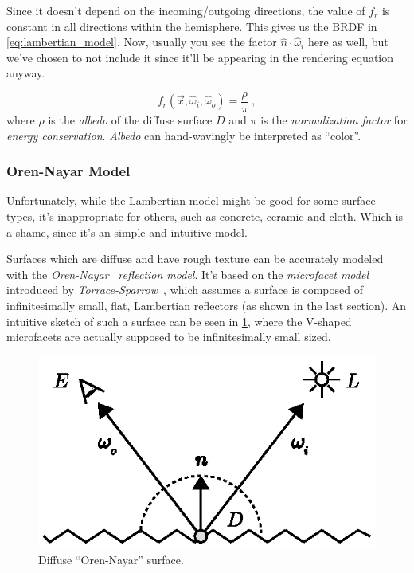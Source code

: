 \documentclass[a4paper, twocolumn]{article}
\begin{document}
                Since it doesn't depend on the incoming/outgoing directions, the value of \(f_r\) is constant in all directions within the hemisphere. This gives us the BRDF in \cref{eq:lambertian_model}. Now, usually you see the factor \(\hat{n} \cdot \hat{\omega}_i\) here as well, but we've chosen to not include it since it'll be appearing in the rendering equation anyway.

                \begin{equation} \label{eq:lambertian_model}
                    f_r(\vec{x}, \hat{\omega}_i, \hat{\omega}_o) = \frac{\rho}{\pi} \; ,
                \end{equation} where \(\rho\) is the \emph{albedo} of the diffuse surface \(D\) and \(\pi\) is the \emph{normalization factor} for \emph{energy conservation}. \emph{Albedo} can hand-wavingly be interpreted as ``color''.

            \subsubsection{Oren-Nayar Model} \label{sec:oren-nayar_model}

                Unfortunately, while the Lambertian model might be good for some surface types, it's inappropriate for others, such as concrete, ceramic and cloth. Which is a shame, since it's an simple and intuitive model.

                Surfaces which are diffuse and have rough texture can be accurately modeled with the \emph{Oren-Nayar}~\cite{oren1994generalization} \emph{reflection model}. It's based on the \emph{microfacet model} introduced by \emph{Torrace-Sparrow}~\cite{torrance1967theory}, which assumes a surface is composed of infinitesimally small, flat, Lambertian reflectors (as shown in the last section). An intuitive sketch of such a surface can be seen in \cref{fig:oren-nayar_model}, where the V-shaped microfacets are actually supposed to be infinitesimally small sized.

                \begin{figure}[H]
                    \centering
                    \includegraphics[width=0.8\linewidth]{share/oren-nayar_model.eps}
                    \caption{Diffuse ``Oren-Nayar'' surface.}
                    \label{fig:oren-nayar_model}
                \end{figure}
\end{document}
